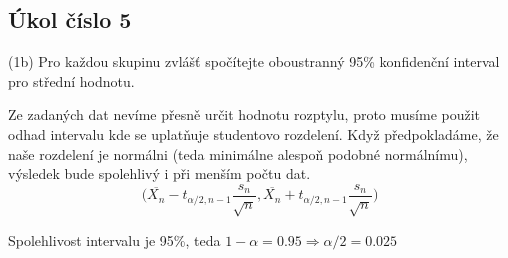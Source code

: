 \documentclass[paper=a4, fontsize=12pt]{scrartcl}
\numberwithin{equation}{section}		%
\numberwithin{figure}{section}			%
\numberwithin{table}{section}				%
\begin{document}
\subsection{Úkol číslo 5}
(1b) Pro každou skupinu zvlášť spočítejte oboustranný 95\% konfidenční interval pro střední hodnotu.
\newline\par
Ze zadaných dat nevíme přesně určit hodnotu rozptylu, proto musíme použit odhad intervalu kde se uplatňuje studentovo rozdelení. Když předpokladáme, že naše rozdelení je normálni (teda minimálne alespoň podobné normálnímu), výsledek bude spolehlivý i při menším počtu dat. 
\[ 
\bigg(\overline{X_n} - t_{\alpha/2,n-1}\frac{s_n}{\sqrt{n}},
 \overline{X_n} + t_{\alpha/2,n-1}\frac{s_n}{\sqrt{n}} \bigg) 
\] \par
Spolehlivost intervalu je 95\%, teda \(1 - \alpha = 0.95 \Rightarrow \alpha/2 = 0.025\)
\end{document}
